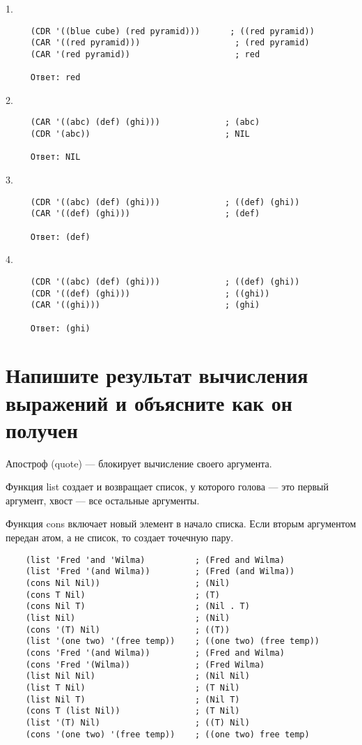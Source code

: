 1. 
\begin{lstlisting}
     (CDR '((blue cube) (red pyramid)))      ; ((red pyramid))
     (CAR '((red pyramid)))                   ; (red pyramid)
     (CAR '(red pyramid))                     ; red

     Ответ: red
\end{lstlisting}

2. 
\begin{lstlisting}
     (CAR '((abc) (def) (ghi)))             ; (abc)
     (CDR '(abc))                           ; NIL

     Ответ: NIL
\end{lstlisting}


3. 
\begin{lstlisting}
     (CDR '((abc) (def) (ghi)))             ; ((def) (ghi))
     (CAR '((def) (ghi)))                   ; (def)

     Ответ: (def)
\end{lstlisting}

\newpage

4. 
\begin{lstlisting}
     (CDR '((abc) (def) (ghi)))             ; ((def) (ghi))
     (CDR '((def) (ghi)))                   ; ((ghi))
     (CAR '((ghi)))                         ; (ghi)

     Ответ: (ghi)
\end{lstlisting}


\section{Напишите результат вычисления выражений и объясните как он получен}

Апостроф (quote) --- блокирует вычисление своего аргумента.

Функция list создает и возвращает список, у которого голова --- это первый аргумент, хвост --- все остальные аргументы.

Функция cons включает новый элемент в начало списка. Если вторым аргументом передан атом, а не список, то создает точечную пару. 

\begin{lstlisting}
    (list 'Fred 'and 'Wilma)          ; (Fred and Wilma)
    (list 'Fred '(and Wilma))         ; (Fred (and Wilma))
    (cons Nil Nil))                   ; (Nil)
    (cons T Nil)                      ; (T)
    (cons Nil T)                      ; (Nil . T)
    (list Nil)                        ; (Nil)
    (cons '(T) Nil)                   ; ((T))
    (list '(one two) '(free temp))    ; ((one two) (free temp))
    (cons 'Fred '(and Wilma))         ; (Fred and Wilma)
    (cons 'Fred '(Wilma))             ; (Fred Wilma)
    (list Nil Nil)                    ; (Nil Nil)
    (list T Nil)                      ; (T Nil)
    (list Nil T)                      ; (Nil T)
    (cons T (list Nil))               ; (T Nil)
    (list '(T) Nil)                   ; ((T) Nil)
    (cons '(one two) '(free temp))    ; ((one two) free temp)
\end{lstlisting}

